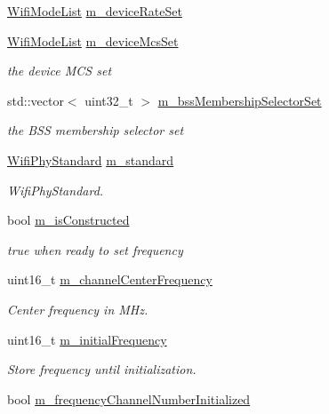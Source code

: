 \begin{DoxyCompactItemize}
\item 
\hyperlink{namespacens3_abceecb3f813d2b4af697068f25085024}{Wifi\+Mode\+List} \hyperlink{classns3_1_1WifiPhy_a0e0115fc8fa16ab9ed50e3e87d8d95d2}{m\+\_\+device\+Rate\+Set}
\item 
\hyperlink{namespacens3_abceecb3f813d2b4af697068f25085024}{Wifi\+Mode\+List} \hyperlink{classns3_1_1WifiPhy_a311c47eab48c799e5cc0d6d0fa0b0bb0}{m\+\_\+device\+Mcs\+Set}
\begin{DoxyCompactList}\small\item\em the device M\+CS set \end{DoxyCompactList}\item 
std\+::vector$<$ uint32\+\_\+t $>$ \hyperlink{classns3_1_1WifiPhy_a59f75b9df0a93949dbd7b3a5e0e22d14}{m\+\_\+bss\+Membership\+Selector\+Set}
\begin{DoxyCompactList}\small\item\em the B\+SS membership selector set \end{DoxyCompactList}\item 
\hyperlink{group__wifi_ga1299834f4e1c615af3ca738033b76a49}{Wifi\+Phy\+Standard} \hyperlink{classns3_1_1WifiPhy_a7c00b0f710272e82eea04068c920a98f}{m\+\_\+standard}
\begin{DoxyCompactList}\small\item\em Wifi\+Phy\+Standard. \end{DoxyCompactList}\item 
bool \hyperlink{classns3_1_1WifiPhy_a61f888ec1fe29d38d206df607596161f}{m\+\_\+is\+Constructed}
\begin{DoxyCompactList}\small\item\em true when ready to set frequency \end{DoxyCompactList}\item 
uint16\+\_\+t \hyperlink{classns3_1_1WifiPhy_a4a481fa0f089d488e1520022dc353aca}{m\+\_\+channel\+Center\+Frequency}
\begin{DoxyCompactList}\small\item\em Center frequency in M\+Hz. \end{DoxyCompactList}\item 
uint16\+\_\+t \hyperlink{classns3_1_1WifiPhy_a599d1a4cbb27e5a9f4dbef69d29c5b5a}{m\+\_\+initial\+Frequency}
\begin{DoxyCompactList}\small\item\em Store frequency until initialization. \end{DoxyCompactList}\item 
bool \hyperlink{classns3_1_1WifiPhy_aac5b6bb7af0e3c2c3590ab1d893a34d2}{m\+\_\+frequency\+Channel\+Number\+Initialized}

\end{DoxyCompactItemize}
